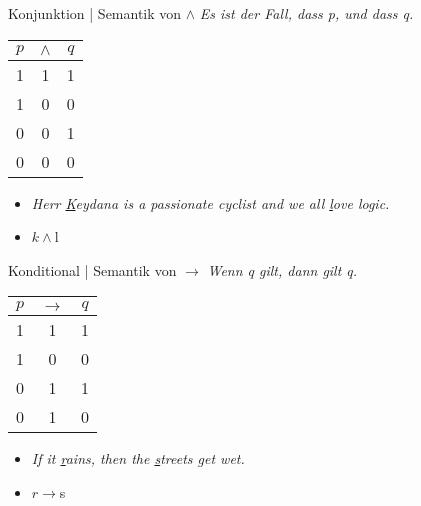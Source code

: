 \begin{frame}
  {Konjunktion | Semantik von $\wedge$}
  \onslide<+->
  \onslide<+->
  \textit{Es ist der Fall, dass p, und dass q.}\\
  \onslide<+->
  \Halbzeile
    \begin{center}
      \begin{tabular}{ccc}
        $p$ & $\wedge$ & $q$\\
        \hline
        1 & \alert{1} & 1 \\
        1 & \alert{0} & 0 \\
        0 & \alert{0} & 1 \\
        0 & \alert{0} & 0 \\
      \end{tabular}
    \end{center}
    \Halbzeile
  \begin{itemize}[<+->]
    \item \textit{Herr \underline{K}eydana is a passionate cyclist \alert{and} we all \underline{l}ove logic.}
    \item \alert{$k\wedge$l}
  \end{itemize}
\end{frame}

\begin{frame}
  {Konditional | Semantik von $\rightarrow$}
  \onslide<+->
  \onslide<+->
  \textit{Wenn q gilt, dann gilt q.}\\
  \onslide<+->
  \Halbzeile
  \begin{center}
    \begin{tabular}{ccc}
      $p$ & $\rightarrow$ & $q$\\
      \hline
      1 & \alert{1} & 1 \\
      1 & \alert{0} & 0 \\
      0 & \alert{1} & 1 \\
      0 & \alert{1} & 0 \\
    \end{tabular}
  \end{center}
  \begin{itemize}[<+->]
    \item \textit{\alert{If} it \underline{r}ains, \alert{then} the \underline{s}treets get wet.}
    \item \alert{$r\rightarrow$s}
  \end{itemize}
\end{frame}

